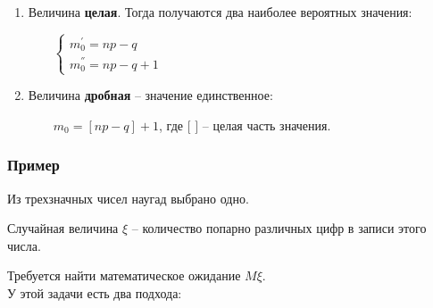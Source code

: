 \documentclass{article}
\begin{document}
\begin{enumerate}
\begin{enumerate}
\item Величина \textbf{целая}. Тогда получаются два наиболее вероятных значения:

$\qquad \begin{cases}
m_0^{'} = np - q\\
m_0^{''} = np - q + 1
\end{cases}$

\item Величина \textbf{дробная} -- значение единственное:

$\qquad m_0 = [np - q] + 1$, где $[$ $]$ -- целая часть значения.

\end{enumerate}
\end{enumerate}

\subsubsection{Пример}

Из трехзначных чисел наугад выбрано одно. 

Случайная величина $\xi$ -- количество попарно различных цифр в записи этого числа.

Требуется найти математическое ожидание $M\xi$.
\\

У этой задачи есть два подхода:
\end{document}
